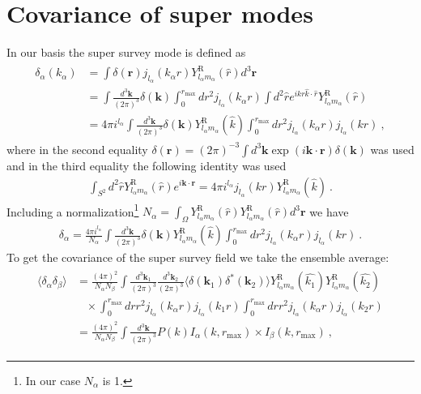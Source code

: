 \documentclass[11pt, oneside]{article}   	%
\newcommand{\sph}[2]{Y^\text{R}_{l_#1 m_#1}(\hat{#2})}
\newcommand{\jl}[1]{j_{l_#1}}
\newcommand{\dk}{\frac{ d^3 \mathbf{k}}{(2 \pi)^3}}
\newcommand{ \dkv}[1]{\frac{ d^3 \mathbf{k}_{#1}}{(2 \pi)^3}}
\begin{document}
\section{Covariance of super modes}
In our basis the super survey mode is defined as 
\begin{align} 
\begin{split} 
\delta_\alpha(k_\alpha)& = \int \delta(\mathbf{r}) \jl{\alpha}(k_\alpha r) \sph{\alpha}{r} d^3 \mathbf{r}  \\
& = \int \dk \delta(\mathbf{k}) \int_0^{r_\text{max}} dr^2 \jl{\alpha}(k_\alpha r) \int d^2 \hat{r} e^{ikr \hat{k} \cdot \hat{r}} \sph{\alpha}{r} \\
& =4 \pi i^{l_\alpha}\int  \dk \delta(\mathbf{k})  \sph{\alpha}{k}  \int_0^{r_\text{max}} dr^2 \jl{\alpha}(k_\alpha r) \jl{\alpha}(kr)  ~,
\end{split} 
\end{align} 
where in the second equality $\delta(\mathbf{r})=(2\pi)^{-3} \int d^3 \mathbf{k} \exp(i \mathbf{k} \cdot \mathbf{r}) \delta(\mathbf{k})$ was used and in the third equality the following identity was used 
\begin{align} \int_{S^2} d^2 \hat{r} \sph{\alpha}{r} e^{i \mathbf{k} \cdot \mathbf{r}} = 4 \pi i^{l_\alpha} j_{l_\alpha}(k r)\sph{\alpha}{k}~.
\end{align}
Including a normalization\footnote{In our case $N_\alpha$ is 1.} $N_\alpha= \int_\Omega \sph{\alpha}{r} \sph{\alpha}{r} d^3 \mathbf{r} $ we have
\begin{align} 
\delta_\alpha= \frac{4 \pi i^{l_\alpha}}{N_\alpha} \int  \dk \delta(\mathbf{k})  \sph{\alpha}{k}  \int_0^{r_\text{max}} dr^2 \jl{\alpha}(k_\alpha r) \jl{\alpha}(kr)  ~.
\end{align} 
To get the covariance of the super survey field we take the ensemble average:
\begin{align} 
\begin{split} 
\langle \delta_\alpha \delta_\beta \rangle &= \frac{ (4 \pi)^2}{N_\alpha N_\beta} \int  \dkv{1} \dkv{2} \langle \delta(\mathbf{k}_1) \delta^*(\mathbf{k}_2) \rangle \sph{\alpha}{k_1} \sph{\alpha}{k_2} \\
& \;\;\; \times   \int_0^{r_\text{max}}  dr r^2 \jl{\alpha}(k_\alpha r) \jl{\alpha}( k_1 r) \int_0^{r_\text{max}}  dr r^2 \jl{\alpha}(k_\alpha r) \jl{\alpha}( k_2 r)  \\
&= \frac{ (4 \pi)^2}{N_\alpha N_\beta} \int \dk P(k) I_\alpha(k, r_\text{max}) \times I_\beta(k, r_\text{max})~,
\end{split} 
\end{align} 
\end{document}
